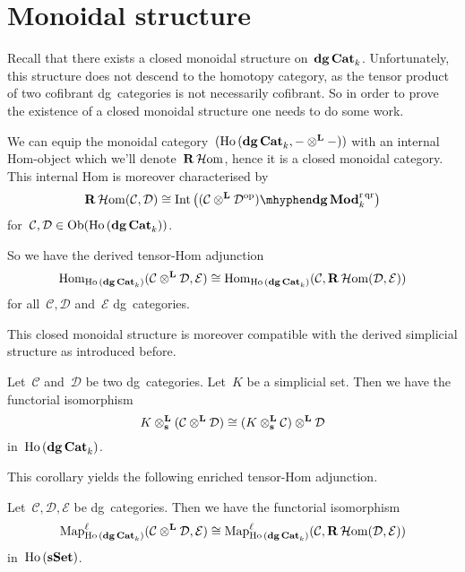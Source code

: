 \section{Monoidal structure}
Recall that there exists a closed monoidal structure on~$\mathbf{dg\,Cat}_k$. Unfortunately, this structure does not descend to the homotopy category, as the tensor product of two cofibrant dg~categories is not necessarily cofibrant. So in order to prove the existence of a closed monoidal structure one needs to do some work.
\begin{theorem}
  \label{theorem:internal-Hom}
  We can equip the monoidal category~$(\mathrm{Ho} \,(\mathbf{dg\,Cat}_k,-\otimes^{\mathbf{L}}-))$ with an internal Hom-object which we'll denote~$\mathbf{R}\operatorname{\mathcal{H}om}$, hence it is a closed monoidal category. This internal Hom is moreover characterised by
  \begin{equation}
    \RRRHHom(\mathcal{C},\mathcal{D})\cong\Int\left( \dgMod{(\mathcal{C}\LLLotimes\mathcal{D}^\opp)}_k^\rqr \right)
  \end{equation}
  for~$\mathcal{C},\mathcal{D}\in\mathrm{Ob}(\mathrm{Ho} \,(\mathbf{dg\,Cat}_k))$.
\end{theorem}
So we have the derived tensor-Hom adjunction
\begin{equation}
  \label{equation:tensor-Hom-adjunction}
  \mathrm{Hom}_{\mathrm{Ho} \,(\mathbf{dg\,Cat}_k)}(\mathcal{C}\otimes^{\mathbf{L}}\mathcal{D},\mathcal{E})\cong\mathrm{Hom}_{\mathrm{Ho} \,(\mathbf{dg\,Cat}_k)}(\mathcal{C},\mathbf{R}\operatorname{\mathcal{H}om}(\mathcal{D},\mathcal{E}))
\end{equation}
for all~$\mathcal{C},\mathcal{D}$ and~$\mathcal{E}$ dg~categories.

This closed monoidal structure is moreover compatible with the derived simplicial structure as introduced before.
\begin{corollary}
  \label{corollary:simplicial-compatibility}
  Let~$\mathcal{C}$ and~$\mathcal{D}$ be two dg~categories. Let~$K$ be a simplicial set. Then we have the functorial isomorphism
  \begin{equation}
    K\otimes^{\mathbf{L}}_{\mathbf{s}}(\mathcal{C}\otimes^{\mathbf{L}}\mathcal{D})\cong(K\otimes^{\mathbf{L}}_{\mathbf{s}}\mathcal{C})\otimes^{\mathbf{L}}\mathcal{D}
  \end{equation}
  in~$\mathrm{Ho} \,(\mathbf{dg\,Cat}_k)$.
\end{corollary}
This corollary yields the following enriched tensor-Hom adjunction.
\begin{corollary}
  \label{corollary:internal-Hom-Map-adjointness}
  Let~$\mathcal{C},\mathcal{D},\mathcal{E}$ be dg~categories. Then we have the functorial isomorphism
  \begin{equation}
    \label{equation:internal-Hom-Map-adjointness}
    \mathrm{Map}_{\mathrm{Ho} \,(\mathbf{dg\,Cat}_k)}^\ell(\mathcal{C}\otimes^{\mathbf{L}}\mathcal{D},\mathcal{E})\cong\mathrm{Map}_{\mathrm{Ho} \,(\mathbf{dg\,Cat}_k)}^\ell(\mathcal{C},\mathbf{R}\operatorname{\mathcal{H}om}(\mathcal{D},\mathcal{E}))
  \end{equation}
  in~$\mathrm{Ho} \,(\mathbf{s\,\!\mathbf{Set}})$.
\end{corollary}


